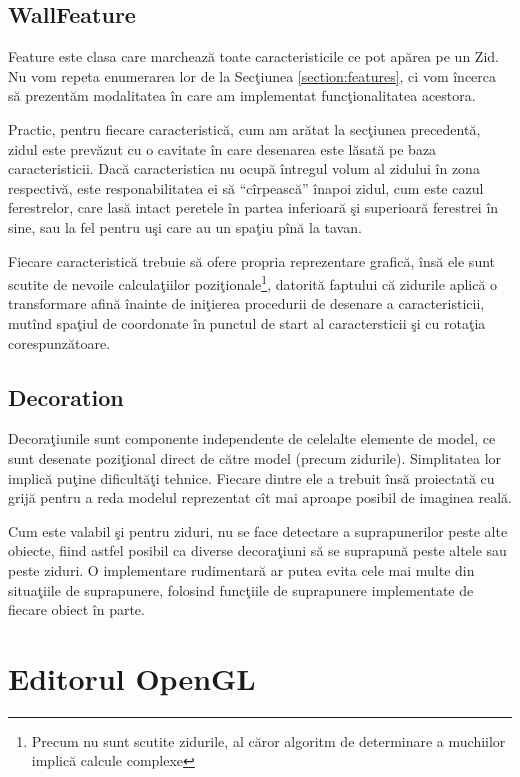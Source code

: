 \subsection{WallFeature}

Feature este clasa care marchează toate caracteristicile ce pot apărea pe un
Zid. Nu vom repeta enumerarea lor de la Secţiunea \ref{section:features}, ci vom
încerca să prezentăm modalitatea în care am implementat funcţionalitatea
acestora.

Practic, pentru fiecare caracteristică, cum am arătat la secţiunea precedentă,
zidul este prevăzut cu o cavitate în care desenarea este lăsată pe baza
caracteristicii. Dacă caracteristica nu ocupă întregul volum al zidului în zona
respectivă, este responabilitatea ei să ``cîrpească'' înapoi zidul, cum este
cazul ferestrelor, care lasă intact peretele în partea inferioară şi superioară
ferestrei în sine, sau la fel pentru uşi care au un spaţiu pînă la tavan.

Fiecare caracteristică trebuie să ofere propria reprezentare grafică, însă ele
sunt scutite de nevoile calculaţiilor poziţionale\footnote{Precum nu sunt
scutite zidurile, al căror algoritm de determinare a muchiilor implică calcule
complexe}, datorită faptului că zidurile aplică o transformare afină înainte de
iniţierea procedurii de desenare a caracteristicii, mutînd spaţiul de coordonate
în punctul de start al caractersticii şi cu rotaţia corespunzătoare.

\subsection{Decoration}

Decoraţiunile sunt componente independente de celelalte elemente de model, ce
sunt desenate poziţional direct de către model (precum zidurile). Simplitatea
lor implică puţine dificultăţi tehnice. Fiecare dintre ele a trebuit însă
proiectată cu grijă pentru a reda modelul reprezentat cît mai aproape posibil de
imaginea reală.

Cum este valabil şi pentru ziduri, nu se face detectare a suprapunerilor peste
alte obiecte, fiind astfel posibil ca diverse decoraţiuni să se suprapună peste
altele sau peste ziduri. O implementare rudimentară ar putea evita cele mai
multe din situaţiile de suprapunere, folosind funcţiile de suprapunere
implementate de fiecare obiect în parte.

\section{Editorul OpenGL}
\label{section:impl-editor}

